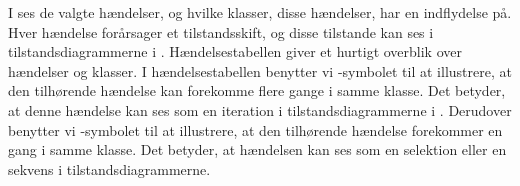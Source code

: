 I  ses de valgte hændelser, og hvilke klasser, disse hændelser, har en indflydelse på. Hver hændelse forårsager et tilstandsskift, og disse tilstande kan ses i tilstandsdiagrammerne i . Hændelsestabellen giver et hurtigt overblik over hændelser og klasser. I hændelsestabellen benytter vi \iter-symbolet til at illustrere, at den tilhørende hændelse kan forekomme flere gange i samme klasse. Det betyder, at denne hændelse kan ses som en iteration i tilstandsdiagrammerne i . Derudover benytter vi \once-symbolet til at illustrere, at den tilhørende hændelse forekommer en gang i samme klasse. Det betyder, at hændelsen kan ses som en selektion eller en sekvens i tilstandsdiagrammerne.


